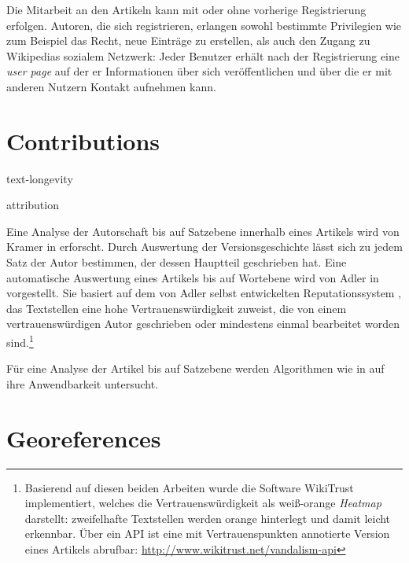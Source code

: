 
Die Mitarbeit an den Artikeln kann mit oder ohne vorherige Registrierung erfolgen.
Autoren, die sich registrieren, erlangen sowohl bestimmte Privilegien wie zum Beispiel das Recht, neue Einträge zu erstellen, als auch den Zugang zu Wikipedias sozialem Netzwerk:
Jeder Benutzer erhält nach der Registrierung eine \emph{user page} auf der er Informationen über sich veröffentlichen und über die er mit anderen Nutzern Kontakt aufnehmen kann.\cite{wikiwhyaccount}


\section{Contributions}\label{sec:contribution}


\begin{todos}
    \item text-longevity
    \item attribution
\end{todos}

Eine Analyse der Autorschaft bis auf Satzebene innerhalb eines Artikels wird von Kramer in \cite{kramer2008wiki} erforscht.
Durch Auswertung der Versionsgeschichte lässt sich zu jedem Satz der Autor bestimmen, der dessen Hauptteil geschrieben hat.
Eine automatische Auswertung eines Artikels bis auf Wortebene wird von Adler in \cite{adler2008assigning} vorgestellt.
Sie basiert auf dem von Adler selbst entwickelten Reputationssystem \cite{adler2007content}, das Textstellen eine hohe Vertrauenswürdigkeit zuweist, die von einem vertrauenswürdigen Autor geschrieben oder mindestens einmal bearbeitet worden sind.\footnote{Basierend auf diesen beiden Arbeiten wurde die Software WikiTrust implementiert, welches die Vertrauenswürdigkeit als weiß-orange \emph{Heatmap} darstellt: zweifelhafte Textstellen werden orange hinterlegt und damit leicht erkennbar. Über ein API ist eine mit Vertrauenspunkten annotierte Version eines Artikels abrufbar: \url{http://www.wikitrust.net/vandalism-api}\label{wikitrust}}

Für eine Analyse der Artikel bis auf Satzebene werden Algorithmen wie in \cite{kramer2008wiki} auf ihre Anwendbarkeit untersucht.


\section{Georeferences}\label{sec:georeference}

